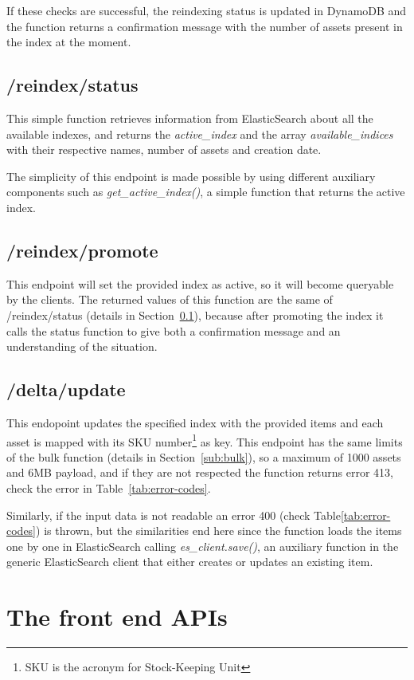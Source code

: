 If these checks are successful, the reindexing status is updated in DynamoDB and the function returns
a confirmation message with the number of assets present in the index at the moment.

\subsection{/reindex/status}
\label{sub:status}
This simple function retrieves information from ElasticSearch about all the available indexes,
and returns the  \textit{active\_index} and  the array \textit{available\_indices} 
with their respective names, number of assets and creation date. 

The simplicity of this endpoint is made possible by using different auxiliary components 
such as \textit{get\_active\_index()}, a simple function that returns the active index.


\subsection{/reindex/promote}
\label{sub:promote}
This endpoint will set the provided index as active, so it will become
queryable by the clients.
The returned values of this function are the same of /reindex/status (details in Section~\ref{sub:status}), because 
after promoting the index it calls the status function to give both a confirmation message
and an understanding of the situation.

\subsection{/delta/update}
\label{sub:update}
This endopoint updates the specified index with the provided items and
each asset is mapped with its SKU number\footnote{SKU is the acronym for Stock-Keeping Unit} as key.
This endpoint has the same limits of the bulk function (details in Section~\ref{sub:bulk}), so a maximum of 1000 assets and 6MB payload, and if they
are not respected the function returns error 413, check the error in Table~\ref{tab:error-codes}.

Similarly, if the input data is not readable an error 400 (check Table\ref{tab:error-codes}) is thrown, but the similarities end here since the 
function loads the items one by one in ElasticSearch calling \textit{es\_client.save()}, an auxiliary function
in the generic ElasticSearch client that either creates or updates an existing item.


\section{The front end APIs}
\label{sec:front_end}

